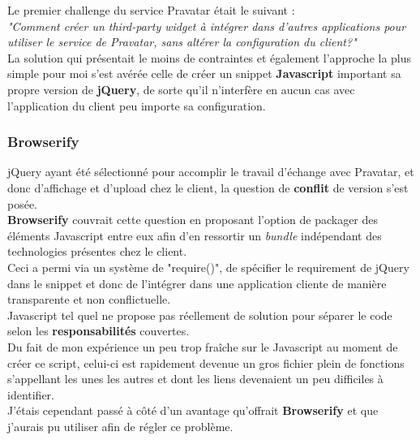 \documentclass{report}
\begin{document}
      Le premier challenge du service Pravatar était le suivant :\\
      \textit{"Comment créer un third-party widget à intégrer dans d'autres applications pour utiliser le service de Pravatar, sans altérer la configuration du client?"}\\

      La solution qui présentait le moins de contraintes et également l'approche la plus simple pour moi s'est avérée celle de créer un snippet \textbf{Javascript} important
      sa propre version de \textbf{jQuery}, de sorte qu'il n'interfère en aucun cas avec l'application du client peu importe sa configuration.\\

        \subsubsection{Browserify}
        \label{subs:Browserify}

          jQuery ayant été sélectionné pour accomplir le travail d'échange avec Pravatar, et donc d'affichage et d'upload chez le client, la question de \textbf{conflit} de version s'est posée.\\

          \textbf{Browserify} couvrait cette question en proposant l'option de packager des éléments Javascript entre eux afin d'en ressortir un
          \textit{bundle} indépendant des technologies présentes chez le client.\\

          Ceci a permi via un système de "require()", de spécifier le requirement de jQuery dans le snippet et donc de l'intégrer dans une application cliente de
          manière transparente et non conflictuelle.\\


          Javascript tel quel ne propose pas réellement de solution pour séparer le code selon les \textbf{responsabilités} couvertes.\\
          Du fait de mon expérience un peu trop fraîche sur le Javascript au moment de créer ce script, celui-ci est rapidement
          devenue un gros fichier plein de fonctions s'appellant les unes les autres et dont les liens devenaient un peu difficiles à identifier.\\

          J'étais cependant passé à côté d'un avantage qu'offrait \textbf{Browserify} et que j'aurais pu utiliser afin de régler ce problème.\\
\end{document}
